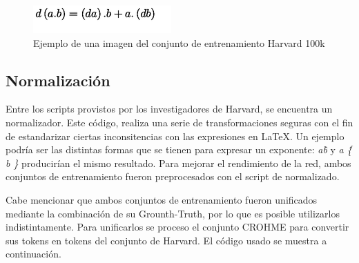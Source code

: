 \begin{figure}[H]
	\centering
	\includegraphics{capitulo5/dataset/harvard}
	\caption{Ejemplo de una imagen del conjunto de entrenamiento Harvard 100k}
	\label{fig:harvard-example}
\end{figure}

\subsection{Normalización}

Entre los scripts provistos por los investigadores de Harvard, se encuentra un normalizador. Este código, realiza una serie de transformaciones seguras con el fin de estandarizar ciertas inconsitencias con las expresiones en \LaTeX{}. Un ejemplo podría ser las distintas formas que se tienen para expresar un exponente: \textit{a\^b} y \textit{a \^ \{ b \}} producirían el mismo resultado. Para mejorar el rendimiento de la red, ambos conjuntos de entrenamiento fueron preprocesados con el script de normalizado.

Cabe mencionar que ambos conjuntos de entrenamiento fueron unificados mediante la combinación de su Grounth-Truth, por lo que es posible utilizarlos indistintamente. Para unificarlos se proceso el conjunto CROHME para convertir sus tokens en tokens del conjunto de Harvard. El código usado se muestra a continuación.



\newpage


